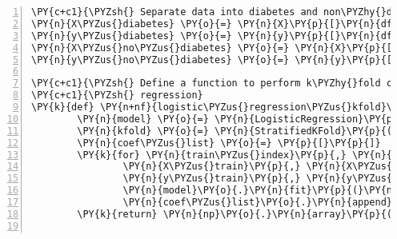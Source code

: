 \documentclass[12pt]{article}
\begin{document}
\begin{Verbatim}[commandchars=\\\{\},numbers=left,firstnumber=1,stepnumber=1,formatcom=\footnotesize]
\PY{c+c1}{\PYZsh{} Separate data into diabetes and non\PYZhy{}diabetes groups}
\PY{n}{X\PYZus{}diabetes} \PY{o}{=} \PY{n}{X}\PY{p}{[}\PY{n}{df}\PY{p}{[}\PY{l+s+s1}{\PYZsq{}}\PY{l+s+s1}{Diabetes\PYZus{}binary}\PY{l+s+s1}{\PYZsq{}}\PY{p}{]} \PY{o}{==} \PY{l+m+mi}{1}\PY{p}{]}
\PY{n}{y\PYZus{}diabetes} \PY{o}{=} \PY{n}{y}\PY{p}{[}\PY{n}{df}\PY{p}{[}\PY{l+s+s1}{\PYZsq{}}\PY{l+s+s1}{Diabetes\PYZus{}binary}\PY{l+s+s1}{\PYZsq{}}\PY{p}{]} \PY{o}{==} \PY{l+m+mi}{1}\PY{p}{]}
\PY{n}{X\PYZus{}no\PYZus{}diabetes} \PY{o}{=} \PY{n}{X}\PY{p}{[}\PY{n}{df}\PY{p}{[}\PY{l+s+s1}{\PYZsq{}}\PY{l+s+s1}{Diabetes\PYZus{}binary}\PY{l+s+s1}{\PYZsq{}}\PY{p}{]} \PY{o}{==} \PY{l+m+mi}{0}\PY{p}{]}
\PY{n}{y\PYZus{}no\PYZus{}diabetes} \PY{o}{=} \PY{n}{y}\PY{p}{[}\PY{n}{df}\PY{p}{[}\PY{l+s+s1}{\PYZsq{}}\PY{l+s+s1}{Diabetes\PYZus{}binary}\PY{l+s+s1}{\PYZsq{}}\PY{p}{]} \PY{o}{==} \PY{l+m+mi}{0}\PY{p}{]}

\PY{c+c1}{\PYZsh{} Define a function to perform k\PYZhy{}fold cross\PYZhy{}validated logistic}
\PY{c+c1}{\PYZsh{} regression}
\PY{k}{def} \PY{n+nf}{logistic\PYZus{}regression\PYZus{}kfold}\PY{p}{(}\PY{n}{X}\PY{p}{,} \PY{n}{y}\PY{p}{,} \PY{n}{k}\PY{o}{=}\PY{l+m+mi}{5}\PY{p}{)}\PY{p}{:}
        \PY{n}{model} \PY{o}{=} \PY{n}{LogisticRegression}\PY{p}{(}\PY{n}{solver}\PY{o}{=}\PY{l+s+s1}{\PYZsq{}}\PY{l+s+s1}{liblinear}\PY{l+s+s1}{\PYZsq{}}\PY{p}{)}
        \PY{n}{kfold} \PY{o}{=} \PY{n}{StratifiedKFold}\PY{p}{(}\PY{n}{n\PYZus{}splits}\PY{o}{=}\PY{n}{k}\PY{p}{,} \PY{n}{shuffle}\PY{o}{=}\PY{k+kc}{True}\PY{p}{,} \PY{n}{random\PYZus{}state}\PY{o}{=}\PY{l+m+mi}{42}\PY{p}{)}
        \PY{n}{coef\PYZus{}list} \PY{o}{=} \PY{p}{[}\PY{p}{]}
        \PY{k}{for} \PY{n}{train\PYZus{}index}\PY{p}{,} \PY{n}{test\PYZus{}index} \PY{o+ow}{in} \PY{n}{kfold}\PY{o}{.}\PY{n}{split}\PY{p}{(}\PY{n}{X}\PY{p}{,} \PY{n}{y}\PY{p}{)}\PY{p}{:}
                \PY{n}{X\PYZus{}train}\PY{p}{,} \PY{n}{X\PYZus{}test} \PY{o}{=} \PY{n}{X}\PY{p}{[}\PY{n}{train\PYZus{}index}\PY{p}{]}\PY{p}{,} \PY{n}{X}\PY{p}{[}\PY{n}{test\PYZus{}index}\PY{p}{]}
                \PY{n}{y\PYZus{}train}\PY{p}{,} \PY{n}{y\PYZus{}test} \PY{o}{=} \PY{n}{y}\PY{p}{[}\PY{n}{train\PYZus{}index}\PY{p}{]}\PY{p}{,} \PY{n}{y}\PY{p}{[}\PY{n}{test\PYZus{}index}\PY{p}{]}
                \PY{n}{model}\PY{o}{.}\PY{n}{fit}\PY{p}{(}\PY{n}{X\PYZus{}train}\PY{p}{,} \PY{n}{y\PYZus{}train}\PY{p}{)}
                \PY{n}{coef\PYZus{}list}\PY{o}{.}\PY{n}{append}\PY{p}{(}\PY{n}{model}\PY{o}{.}\PY{n}{coef\PYZus{}}\PY{p}{[}\PY{l+m+mi}{0}\PY{p}{]}\PY{p}{)}
        \PY{k}{return} \PY{n}{np}\PY{o}{.}\PY{n}{array}\PY{p}{(}\PY{n}{coef\PYZus{}list}\PY{p}{)}


\end{Verbatim}
\end{document}
